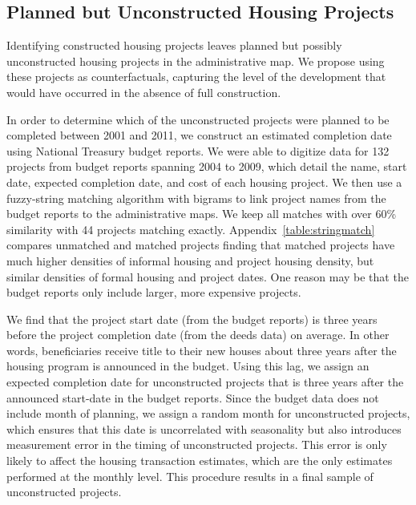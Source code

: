 \documentclass[12pt]{article}
\begin{document}
\subsection{Planned but Unconstructed Housing Projects}


Identifying constructed housing projects leaves planned but possibly unconstructed housing projects in the administrative map.  We propose using these projects as counterfactuals, capturing the level of the development that would have occurred in the absence of full construction.  

In order to determine which of the unconstructed projects were planned to be completed between 2001 and 2011, we construct an estimated completion date using National Treasury budget reports.  We were able to digitize data for 132 projects from budget reports spanning 2004 to 2009, which detail the name, start date, expected completion date, and cost of each housing project.  We then use a fuzzy-string matching algorithm with bigrams to link project names from the budget reports to the administrative maps.  We keep all matches with over 60\% similarity with 44 projects matching exactly.  Appendix~\ref{table:stringmatch} compares unmatched and matched projects finding that matched projects have much higher densities of informal housing and project housing density, but similar densities of formal housing and project dates.  One reason may be that the budget reports only include larger, more expensive projects.

We find that the project start date (from the budget reports) is three years before the project completion date (from the deeds data) on average.  In other words, beneficiaries receive title to their new houses about three years after the housing program is announced in the budget.  Using this lag, we assign an expected completion date for unconstructed projects that is three years after the announced start-date in the budget reports.  Since the budget data does not include month of planning, we assign a random month for unconstructed projects, which ensures that this date is uncorrelated with seasonality but also introduces measurement error in the timing of unconstructed projects.  This error is only likely to affect the housing transaction estimates, which are the only estimates performed at the monthly level.  This procedure results in a final sample of unconstructed projects.
\end{document}
